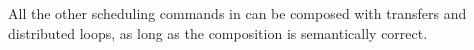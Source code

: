 

All the other scheduling commands in \framework{} can be composed with transfers and distributed loops, as long as the composition is semantically correct. 
